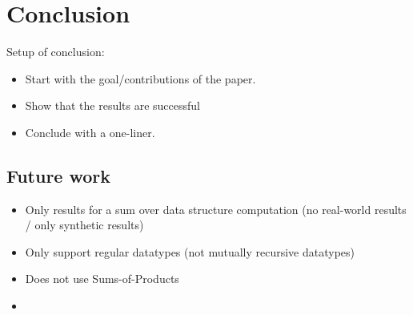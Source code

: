 \chapter{Conclusion}




Setup of conclusion:
\begin{itemize}
  \item Start with the goal/contributions of the paper.
  \item Show that the results are successful
  \item Conclude with a one-liner.
\end{itemize}


\section{Future work}

\begin{itemize}
  \item Only results for a sum over data structure computation (no real-world results / only synthetic results)
  \item Only support regular datatypes (not mutually recursive datatypes)
  \item Does not use Sums-of-Products
  \item 
\end{itemize}